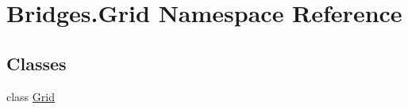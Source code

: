 \hypertarget{namespace_bridges_1_1_grid}{}\section{Bridges.\+Grid Namespace Reference}
\label{namespace_bridges_1_1_grid}
\subsection*{Classes}
\begin{DoxyCompactItemize}
\item 
class \mbox{\hyperlink{class_bridges_1_1_grid_1_1_grid}{Grid}}
\end{DoxyCompactItemize}
